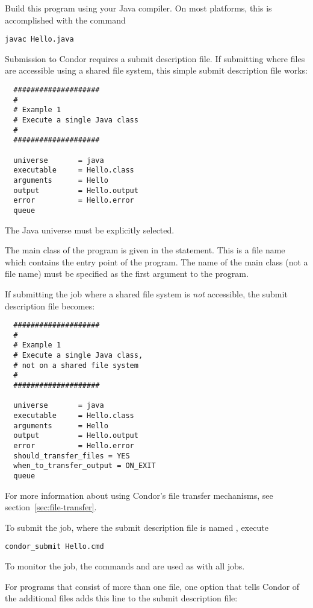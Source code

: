 Build this program using your Java compiler.
On most platforms, this is
accomplished with the command
\begin{verbatim}
javac Hello.java
\end{verbatim}

Submission to Condor requires a submit description file.
If submitting where files are accessible using a
shared file system,
this simple submit description file works:

\begin{verbatim}
  ####################
  #
  # Example 1
  # Execute a single Java class
  #
  ####################

  universe       = java
  executable     = Hello.class
  arguments      = Hello
  output         = Hello.output
  error          = Hello.error
  queue
\end{verbatim}

The Java universe must be explicitly selected.

The main class of the program is given in the  statement.
This is a file name which contains the entry point of the program.
The name of the main class (not a file name) must
be specified as the first argument to the program.

If submitting the job where a shared file system is \emph{not}
accessible,
the submit description file becomes:

\begin{verbatim}
  ####################
  #
  # Example 1
  # Execute a single Java class,
  # not on a shared file system
  #
  ####################

  universe       = java
  executable     = Hello.class
  arguments      = Hello
  output         = Hello.output
  error          = Hello.error
  should_transfer_files = YES
  when_to_transfer_output = ON_EXIT
  queue
\end{verbatim}
For more information about using Condor's file transfer mechanisms,
see section~\ref{sec:file-transfer}.

To submit the job, where the submit description file
is named , 
execute 
\begin{verbatim}
condor_submit Hello.cmd
\end{verbatim}

To monitor the job, the commands  and 
are used as with all jobs.

For programs that 
consist of more than one  file,
one option that tells Condor of the additional files adds
this line to the submit description file:

